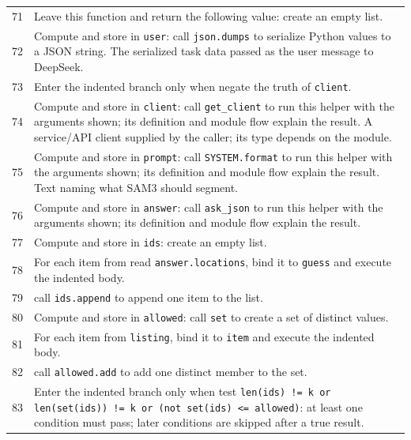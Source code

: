 \documentclass[11pt,a4paper]{book}
\begin{document}
\begin{longtable}{r p{}}
71 & Leave this function and return the following value: create an empty list. \\

72 & Compute and store in \texttt{user}: call \texttt{json.dumps} to serialize Python values to a JSON string. The serialized task data passed as the user message to DeepSeek. \\

73 & Enter the indented branch only when negate the truth of \texttt{client}. \\

74 & Compute and store in \texttt{client}: call \texttt{get\_client} to run this helper with the arguments shown; its definition and module flow explain the result. A service/API client supplied by the caller; its type depends on the module. \\

75 & Compute and store in \texttt{prompt}: call \texttt{SYSTEM.format} to run this helper with the arguments shown; its definition and module flow explain the result. Text naming what SAM3 should segment. \\

76 & Compute and store in \texttt{answer}: call \texttt{ask\_json} to run this helper with the arguments shown; its definition and module flow explain the result.  \\

77 & Compute and store in \texttt{ids}: create an empty list.  \\

78 & For each item from read \texttt{answer.locations}, bind it to \texttt{guess} and execute the indented body. \\

79 & call \texttt{ids.append} to append one item to the list. \\

80 & Compute and store in \texttt{allowed}: call \texttt{set} to create a set of distinct values.  \\

81 & For each item from \texttt{listing}, bind it to \texttt{item} and execute the indented body. \\

82 & call \texttt{allowed.add} to add one distinct member to the set. \\

83 & Enter the indented branch only when test \texttt{len(ids) != k or len(set(ids)) != k or (not set(ids) <= allowed)}: at least one condition must pass; later conditions are skipped after a true result. \\


\end{longtable}
\end{document}
